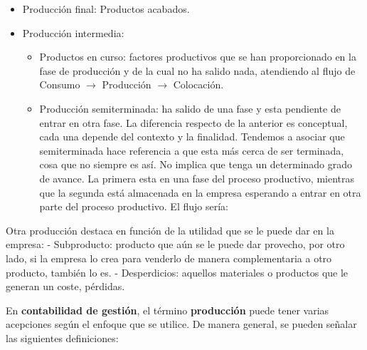 \documentclass[12pt]{book} %
\providecommand{\tightlist}{%
  \setlength{\itemsep}{0pt}\setlength{\parskip}{0pt}}
\begin{document}
\begin{itemize}
\tightlist
\item
  Producción final: Productos acabados.
\item
  Producción intermedia:

  \begin{itemize}
  \item
    Productos en curso: factores productivos que se han proporcionado en
    la fase de producción y de la cual no ha salido nada, atendiendo al
    flujo de Consumo \(\rightarrow\) Producción \(\rightarrow\)
    Colocación.
  \item
    Producción semiterminada: ha salido de una fase y esta pendiente de
    entrar en otra fase. La diferencia respecto de la anterior es
    conceptual, cada una depende del contexto y la finalidad. Tendemos a
    asociar que semiterminada hace referencia a que esta más cerca de
    ser terminada, cosa que no siempre es así. No implica que tenga un
    determinado grado de avance. La primera esta en una fase del proceso
    productivo, mientras que la segunda está almacenada en la empresa
    esperando a entrar en otra parte del proceso productivo. El flujo
    sería:

  \end{itemize}
\end{itemize}

Otra producción destaca en función de la utilidad que se le puede dar en
la empresa: - Subproducto: producto que aún se le puede dar provecho,
por otro lado, si la empresa lo crea para venderlo de manera
complementaria a otro producto, también lo es. - Desperdicios: aquellos
materiales o productos que le generan un coste, pérdidas.

En \textbf{contabilidad de gestión}, el término \textbf{producción}
puede tener varias acepciones según el enfoque que se utilice. De manera
general, se pueden señalar las siguientes definiciones:
\end{document}
